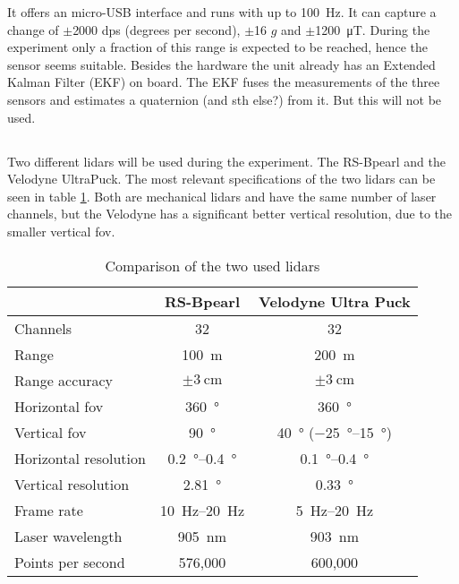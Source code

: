 It offers an micro-USB interface and runs with up to \SI{100}{\Hz}.
It can capture a change of $\pm$2000 dps (degrees per second), $\pm$16 $g$ and $\pm$\SI{1200}{\micro\tesla}.
During the experiment only a fraction of this range is expected to be reached, hence the sensor seems suitable.
Besides the hardware the unit already has an Extended Kalman Filter (EKF) on board.
The EKF fuses the measurements of the three sensors and estimates a quaternion (and sth else?) from it.
But this will not be used.


\subsection{}
Two different \gls{lidar}s will be used during the experiment.
The RS-Bpearl and the Velodyne UltraPuck.
The most relevant specifications of the two \gls{lidar}s can be seen in table \ref{tab:lidar_datasheets}.
Both are mechanical \gls{lidar}s and have the same number of laser channels, but the Velodyne has a significant better vertical resolution, due to the smaller vertical \gls{fov}.
\begin{table}[ht]
	\centering
	\caption{Comparison of the two used \acrshort{lidar}s \cite{RoboSense2020}\cite{Velodyne2018}}
	\label{tab:lidar_datasheets}
	\begin{tabular}[t]{lcc}
		\toprule
		                      & \textbf{RS-Bpearl}          & \textbf{Velodyne Ultra Puck}                  \\
		\midrule
		Channels              & 32                          & 32                                            \\
		Range                 & \SI{100}{\metre}            & \SI{200}{\metre}                              \\
		Range accuracy        & $\pm\SI{3}{\centi\metre}$   & $\pm\SI{3}{\centi\metre}$                     \\
		Horizontal \gls{fov}  & \SI{360}{\degree}           & \SI{360}{\degree}                             \\
		Vertical \gls{fov}    & \SI{90}{\degree}            & \SI{40}{\degree} (\SIrange{-25}{15}{\degree}) \\
		Horizontal resolution & \SIrange{0.2}{0.4}{\degree} & \SIrange{0.1}{0.4}{\degree}                   \\
		Vertical resolution   & \SI{2.81}{\degree}          & \SI{0.33}{\degree}                            \\
		Frame rate            & \SIrange{10}{20}{\hertz}    & \SIrange{5}{20}{\hertz}                       \\
		Laser wavelength      & \SI{905}{\nano\metre}       & \SI{903}{\nano\metre}                         \\
		Points per second     & 576,000                     & 600,000                                       \\
		\bottomrule
	\end{tabular}
\end{table}%

